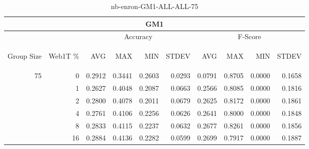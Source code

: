 \begin{center}
\begin{table}[htbp]
\begin{tabular}{ | r | r | r | r | r | r | r | r | r | r |}
\hline
\multicolumn{10}{|c|}{GM1}\\
\hline
 & & \multicolumn{4}{|c|}{Accuracy} & \multicolumn{4}{|c|}{F-Score}\\ \cline{3-10}
\begin{sideways}Group Size\end{sideways} & \begin{sideways}Web1T \%\end{sideways} & \begin{sideways}AVG\end{sideways} & \begin{sideways}MAX\end{sideways} & \begin{sideways}MIN\end{sideways} & \begin{sideways}STDEV\end{sideways} & \begin{sideways}AVG\end{sideways} & \begin{sideways}MAX\end{sideways} & \begin{sideways}MIN\end{sideways} & \begin{sideways}STDEV\end{sideways}\\
\hline
\multirow{5}{*}{75}
 & 0 & 0.2912 & 0.3441 & 0.2603 & 0.0293 & 0.0791 & 0.8705 & 0.0000 & 0.1658\\ \cline{2-10}
 & 1 & 0.2627 & 0.4048 & 0.2087 & 0.0663 & 0.2566 & 0.8085 & 0.0000 & 0.1816\\ \cline{2-10}
 & 2 & 0.2800 & 0.4078 & 0.2011 & 0.0679 & 0.2625 & 0.8172 & 0.0000 & 0.1861\\ \cline{2-10}
 & 4 & 0.2761 & 0.4106 & 0.2256 & 0.0626 & 0.2641 & 0.8000 & 0.0000 & 0.1848\\ \cline{2-10}
 & 8 & 0.2833 & 0.4115 & 0.2237 & 0.0632 & 0.2677 & 0.8261 & 0.0000 & 0.1856\\ \cline{2-10}
 & 16 & 0.2884 & 0.4136 & 0.2282 & 0.0599 & 0.2699 & 0.7917 & 0.0000 & 0.1887\\ \cline{2-10}
\hline
\end{tabular}
\caption{nb-enron-GM1-ALL-ALL-75}
\label{table:nb-enron-GM1-ALL-ALL-75}
\end{table}
\end{center}

